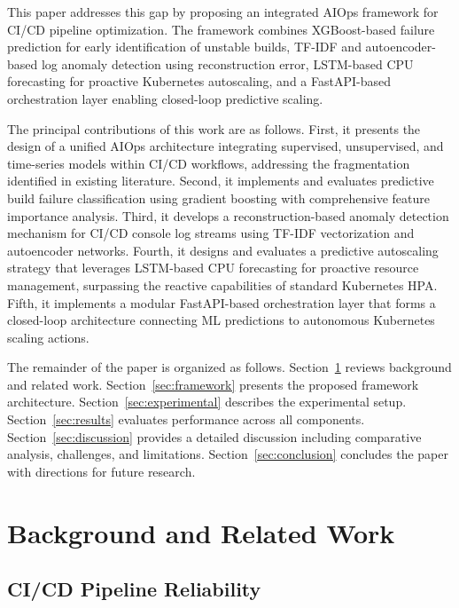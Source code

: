 \documentclass[a4paper,fleqn]{cas-dc}
\begin{document}
This paper addresses this gap by proposing an integrated AIOps framework for CI/CD pipeline optimization.
The framework combines XGBoost-based failure prediction for early identification of unstable builds, TF-IDF and autoencoder-based log anomaly detection using reconstruction error, LSTM-based CPU forecasting for proactive Kubernetes autoscaling, and a FastAPI-based orchestration layer enabling closed-loop predictive scaling.

The principal contributions of this work are as follows. First, it presents the design of a unified AIOps architecture integrating supervised, unsupervised, and time-series models within CI/CD workflows, addressing the fragmentation identified in existing literature.
Second, it implements and evaluates predictive build failure classification using gradient boosting with comprehensive feature importance analysis.
Third, it develops a reconstruction-based anomaly detection mechanism for CI/CD console log streams using TF-IDF vectorization and autoencoder networks.
Fourth, it designs and evaluates a predictive autoscaling strategy that leverages LSTM-based CPU forecasting for proactive resource management, surpassing the reactive capabilities of standard Kubernetes HPA.
Fifth, it implements a modular FastAPI-based orchestration layer that forms a closed-loop architecture connecting ML predictions to autonomous Kubernetes scaling actions.

The remainder of the paper is organized as follows. Section~\ref{sec:related} reviews background and related work.
Section~\ref{sec:framework} presents the proposed framework architecture. Section~\ref{sec:experimental} describes the experimental setup. Section~\ref{sec:results} evaluates performance across all components.
Section~\ref{sec:discussion} provides a detailed discussion including comparative analysis, challenges, and limitations. Section~\ref{sec:conclusion} concludes the paper with directions for future research.

\section{Background and Related Work}\label{sec:related}

\subsection{CI/CD Pipeline Reliability}\label{subsec:cicd}
\end{document}
